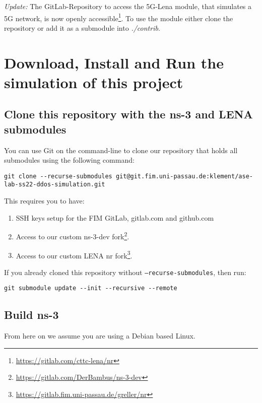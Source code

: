 \textit{Update:} The GitLab-Repository to access the 5G-Lena module, that simulates a 5G network, is now openly accessible\footnote[6]{\url{https://gitlab.com/cttc-lena/nr}}.
To use the module either clone the repository or add it as a submodule into \textit{./contrib}.

\section{Download, Install and Run the simulation of this project}
\label{section:install-project}

\subsection{Clone this repository with the ns-3 and LENA submodules}
You can use Git on the command-line to clone our repository that holds all submodules using the following command:

\begin{verbatim}
git clone --recurse-submodules git@git.fim.uni-passau.de:klement/ase-lab-ss22-ddos-simulation.git
\end{verbatim}

This requires you to have:
\begin{enumerate}
    \item SSH keys setup for the FIM GitLab, gitlab.com and github.com
    \item Access to our custom ns-3-dev fork\footnote[7]{\url{https://gitlab.com/DerBambus/ns-3-dev}}.
    \item Access to our custom LENA nr fork\footnote[8]{\url{https://gitlab.fim.uni-passau.de/greller/nr}}.
\end{enumerate}

If you already cloned this repository without \texttt{--recurse-submodules}, then run:
\begin{verbatim}
git submodule update --init --recursive --remote
\end{verbatim}

\subsection{Build ns-3}
From here on we assume you are using a Debian based Linux.


